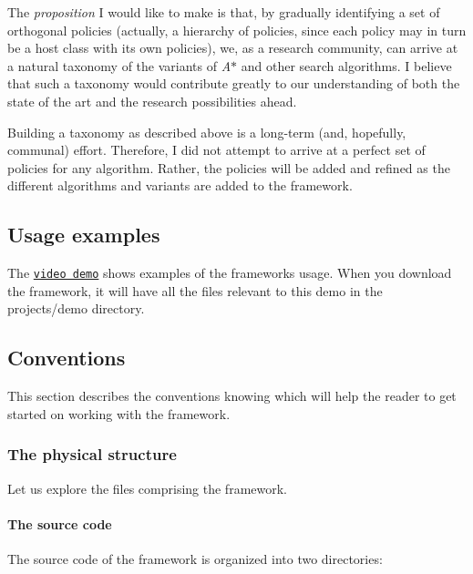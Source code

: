 The {\itshape proposition} I would like to make is that, by gradually identifying a set of orthogonal policies (actually, a hierarchy of policies, since each policy may in turn be a host class with its own policies), we, as a research community, can arrive at a natural taxonomy of the variants of {\itshape A$\ast$} and other search algorithms. I believe that such a taxonomy would contribute greatly to our understanding of both the state of the art and the research possibilities ahead.

Building a taxonomy as described above is a long-\/term (and, hopefully, communal) effort. Therefore, I did not attempt to arrive at a perfect set of policies for any algorithm. Rather, the policies will be added and refined as the different algorithms and variants are added to the framework.\hypertarget{index_s-examples}{}\subsection{Usage examples}\label{index_s-examples}
The \href{https://youtu.be/cElxLWve1Zw}{\tt video demo} shows examples of the framework\textquotesingle{}s usage. When you download the framework, it will have all the files relevant to this demo in the {\ttfamily projects/demo directory}.\hypertarget{index_s-concepts}{}\subsection{Conventions}\label{index_s-concepts}
This section describes the conventions knowing which will help the reader to get started on working with the framework.\hypertarget{index_s-physical}{}\subsubsection{The physical structure}\label{index_s-physical}
Let us explore the files comprising the framework.\hypertarget{index_s-source}{}\paragraph{The source code}\label{index_s-source}
The source code of the framework is organized into two directories\+:
